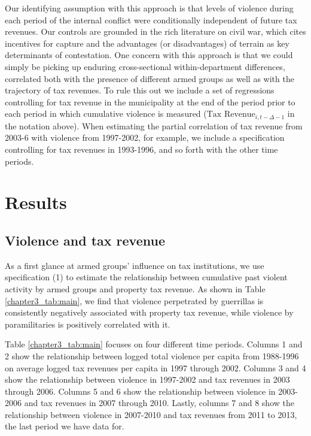 Our identifying assumption with this approach is that levels of violence during each period of the internal conflict were conditionally independent of future tax revenues. Our controls are grounded in the rich literature on civil war, which cites incentives for capture and the advantages (or disadvantages) of terrain as key determinants of contestation. One concern with this approach is that we could simply be picking up enduring cross-sectional within-department differences, correlated both with the presence of different armed groups as well as with the trajectory of tax revenues. To rule this out we include a set of regressions controlling for tax revenue in the municipality at the end of the period prior to each period in which cumulative violence is measured ($\mbox{Tax Revenue}_{i,t-\Delta-1}$ in the notation above). When estimating the partial correlation of tax revenue from 2003-6 with violence from 1997-2002, for example, we include a specification controlling for tax revenues in 1993-1996, and so forth with the other time periods.

\section{Results}

\subsection{Violence and tax revenue}

As a first glance at armed groups' influence on tax institutions, we use specification (1) to estimate the relationship between cumulative past violent activity by armed groups and property tax revenue. As shown in Table \ref{chapter3_tab:main}, we find that violence perpetrated by guerrillas is consistently negatively associated with property tax revenue, while violence by paramilitaries is positively correlated with it. 

Table \ref{chapter3_tab:main} focuses on four different time periods. Columns 1 and 2 show the relationship between logged total violence per capita from 1988-1996 on average logged tax revenues per capita in 1997 through 2002. Columns 3 and 4 show the relationship between violence in 1997-2002 and tax revenues in 2003 through 2006. Columns 5 and 6 show the relationship between violence in 2003-2006 and tax revenues in 2007 through 2010. Lastly, columns 7 and 8 show the relationship between violence in 2007-2010 and tax revenues from 2011 to 2013, the last period we have data for. 

